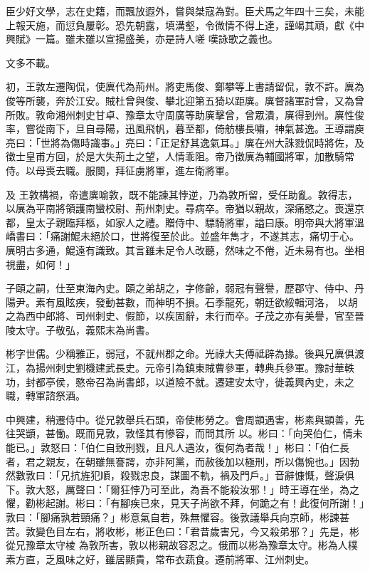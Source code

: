 \begin{pinyinscope}
 臣少好文學，志在史籍，而飄放遐外，嘗與桀寇為對。臣犬馬之年四十三矣，未能上報天施，而愆負屢彰。恐先朝露，填溝壑，令微情不得上達，謹竭其頑，獻《中興賦》一篇。雖未雖以宣揚盛美，亦是詩人嗟
 嘆詠歌之義也。



 文多不載。



 初，王敦左遷陶侃，使廙代為荊州。將吏馬俊、鄭攀等上書請留侃，敦不許。廙為俊等所襲，奔於江安。賊杜曾與俊、攀北迎第五猗以距廙。廙督諸軍討曾，又為曾所敗。敦命湘州刺史甘卓、豫章太守周廣等助廙擊曾，曾眾潰，廙得到州。廙性俊率，嘗從南下，旦自尋陽，迅風飛帆，暮至都，倚舫樓長嘯，神氣甚逸。王導謂庾亮曰：「世將為傷時識事。」亮曰：「正足舒其逸氣耳。」廙在州大誅戮侃時將佐，及徵士皇甫方回，於是大失荊土之望，人情乖阻。帝乃徵廙為輔國將軍，加散騎常侍。以母喪去職。服闋，拜征虜將軍，進左衛將軍。



 及
 王敦構禍，帝遣廙喻敦，既不能諫其悖逆，乃為敦所留，受任助亂。敦得志，以廙為平南將領護南蠻校尉、荊州刺史。尋病卒。帝猶以親故，深痛愍之。喪還京都，皇太子親臨拜柩，如家人之禮。贈侍中、驃騎將軍，謚曰康。明帝與大將軍溫嶠書曰：「痛謝鯤未絕於口，世將復至於此。並盛年雋才，不遂其志，痛切于心。廙明古多通，鯤遠有識致。其言雖未足令人改聽，然味之不倦，近未易有也。坐相視盡，如何！」



 子頤之嗣，仕至東海內史。頤之弟胡之，字修齡，弱冠有聲譽，歷郡守、侍中、丹陽尹。素有風眩疾，發動甚數，而神明不損。石季龍死，朝廷欲綏輯河洛，
 以胡之為西中郎將、司州刺史、假節，以疾固辭，未行而卒。子茂之亦有美譽，官至晉陵太守。子敬弘，義熙末為尚書。



 彬字世儒。少稱雅正，弱冠，不就州郡之命。光祿大夫傅祗辟為掾。後與兄廙俱渡江，為揚州刺史劉機建武長史。元帝引為鎮東賊曹參軍，轉典兵參軍。豫討華軼功，封都亭侯，愍帝召為尚書郎，以道險不就。遷建安太守，徙義興內史，未之職，轉軍諮祭酒。



 中興建，稍遷侍中。從兄敦舉兵石頭，帝使彬勞之。會周顗遇害，彬素與顗善，先往哭顗，甚慟。既而見敦，敦怪其有慘容，而問其所
 以。彬曰：「向哭伯仁，情未能已。」敦怒曰：「伯仁自致刑戮，且凡人遇汝，復何為者哉！」彬曰：「伯仁長者，君之親友，在朝雖無謇諤，亦非阿黨，而赦後加以極刑，所以傷惋也。」因勃然數敦曰：「兄抗旌犯順，殺戮忠良，謀圖不軌，禍及門戶。」音辭慷慨，聲淚俱下。敦大怒，厲聲曰：「爾狂悖乃可至此，為吾不能殺汝邪！」時王導在坐，為之懼，勸彬起謝。彬曰：「有腳疾已來，見天子尚欲不拜，何跪之有！此復何所謝！」敦曰：「腳痛孰若頸痛？」彬意氣自若，殊無懼容。後敦議舉兵向京師，彬諫甚苦。敦變色目左右，將收彬，彬正色曰：「君昔歲害兄，今又殺弟邪？」先是，彬從兄豫章太守棱
 為敦所害，敦以彬親故容忍之。俄而以彬為豫章太守。彬為人樸素方直，乏風味之好，雖居顯貴，常布衣蔬食。遷前將軍、江州刺史。




\end{pinyinscope}
